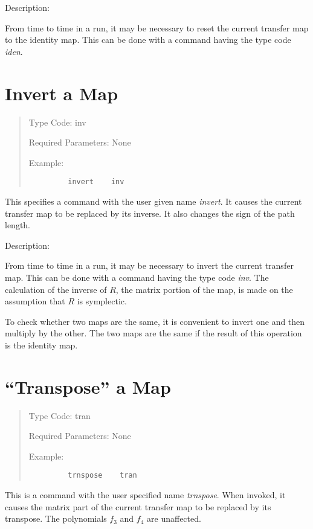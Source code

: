 \vspace{5mm}
     Description:
\vspace{2mm}

         From time to time in a \Mary run, it may be necessary to reset
the current transfer map to the identity map.  This can be done with a
command having the type code {\em iden}.

\newpage
\section{Invert a Map}
\begin{quotation}
\noindent Type Code:  inv
\vspace{5mm}

\noindent Required Parameters:  None

\vspace{5mm}
\noindent     Example:
\begin{verbatim}
         invert    inv
\end{verbatim}
\end{quotation}
This specifies a command with the user given name {\em invert}.  It causes the
current transfer map to be replaced by its inverse.  It also changes the sign of the path length.

\vspace{5mm}
     Description:
\vspace{2mm}

         From time to time in a \Mary run, it may be necessary to invert
the current transfer map.  This can be done with a command having the type
code {\em inv}.  The calculation of the inverse of $R$, the matrix portion of the
map, is made on the assumption that $R$ is symplectic.

To check whether two maps are the same, it is convenient to invert one
and then multiply by the other.  The two maps are the same if the result
of this operation is the identity map.

\newpage
\section{``Transpose'' a Map}
\begin{quotation}
\noindent Type Code:  tran
\vspace{5mm}

\noindent Required Parameters:  None
\vspace{5mm}

\noindent Example:
\begin{verbatim}
         trnspose    tran
\end{verbatim}
\end{quotation}
This is a command with the user specified name {\em trnspose}.  When invoked, it
causes the matrix part of the current transfer map to be replaced by its
transpose.  The polynomials $f_3$  and $f_4$  are unaffected.

